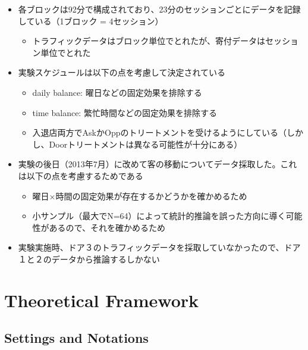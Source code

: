 \documentclass[../root]{subfiles}
\begin{document}
    
    \begin{itemize}
        \item 各ブロックは92分で構成されており、23分のセッションごとにデータを記録している（1ブロック = 4セッション）
        \begin{itemize}
            \item トラフィックデータはブロック単位でとれたが、寄付データはセッション単位でとれた
        \end{itemize}
        \item 実験スケジュールは以下の点を考慮して決定されている
        \begin{itemize}
            \item daily balance: 曜日などの固定効果を排除する
            \item time balance: 繁忙時間などの固定効果を排除する
            \item 入退店両方でAskかOppのトリートメントを受けるようにしている（しかし、Doorトリートメントは異なる可能性が十分にある）
        \end{itemize}
        \item 実験の後日（2013年7月）に改めて客の移動についてデータ採取した。これは以下の点を考慮するためである
        \begin{itemize}
            \item 曜日×時間の固定効果が存在するかどうかを確かめるため
            \item 小サンプル（最大でN=64）によって統計的推論を誤った方向に導く可能性があるので、それを確かめるため
        \end{itemize}
        \item 実験実施時、ドア３のトラフィックデータを採取していなかったので、ドア１と２のデータから推論するしかない
    \end{itemize}

    \section{Theoretical Framework}

    \subsection{Settings and Notations}
\end{document}
